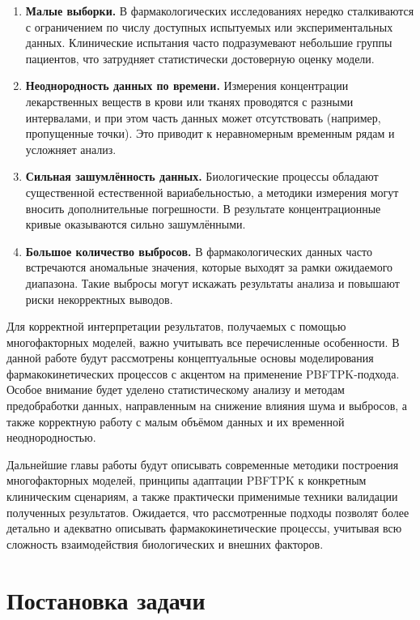 \documentclass[12pt]{article}
\begin{document}
\begin{enumerate}
	\item \textbf{Малые выборки.} В фармакологических исследованиях нередко сталкиваются с ограничением по числу доступных испытуемых или экспериментальных данных. Клинические испытания часто подразумевают небольшие группы пациентов, что затрудняет статистически достоверную оценку модели.

	\item \textbf{Неоднородность данных по времени.} Измерения концентрации лекарственных веществ в крови или тканях проводятся с разными интервалами, и при этом часть данных может отсутствовать (например, пропущенные точки). Это приводит к неравномерным временным рядам и усложняет анализ.

	\item \textbf{Сильная зашумлённость данных.} Биологические процессы обладают существенной естественной вариабельностью, а методики измерения могут вносить дополнительные погрешности. В результате концентрационные кривые оказываются сильно зашумлёнными.

	\item \textbf{Большое количество выбросов.} В фармакологических данных часто встречаются аномальные значения, которые выходят за рамки ожидаемого диапазона. Такие выбросы могут искажать результаты анализа и повышают риски некорректных выводов.

\end{enumerate}

Для корректной интерпретации результатов, получаемых с помощью многофакторных моделей, важно учитывать все перечисленные особенности. В данной работе будут рассмотрены концептуальные основы моделирования фармакокинетических процессов с акцентом на применение PBFTPK-подхода. Особое внимание будет уделено статистическому анализу и методам предобработки данных, направленным на снижение влияния шума и выбросов, а также корректную работу с малым объёмом данных и их временной неоднородностью.

Дальнейшие главы работы будут описывать современные методики построения многофакторных моделей, принципы адаптации PBFTPK к конкретным клиническим сценариям, а также практически применимые техники валидации полученных результатов. Ожидается, что рассмотренные подходы позволят более детально и адекватно описывать фармакокинетические процессы, учитывая всю сложность взаимодействия биологических и внешних факторов.

\newpage

\section{Постановка задачи}
\end{document}
